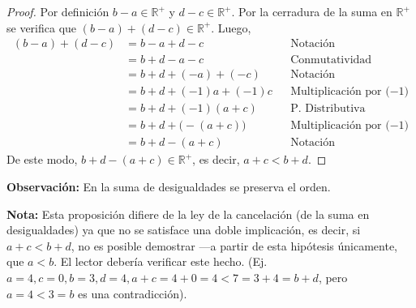 \documentclass[11pt]{article}
\newcommand{\R}{\mathbb{R}}
\begin{document}
\begin{enumerate}[label=\alph*)]
    \vspace{-1em}\begin{proof} 
        Por definición $b-a\in \R^+$ y $d-c\in \R^+$. Por la cerradura de la suma en $\R^+$ se verifica que $(b-a)+(d-c) \in \R^+$. Luego, \begin{align*}
            (b-a)+(d-c) &= b-a+d-c && \text{Notación}\\
            &= b+d-a-c && \text{Conmutatividad}\\
            &= b+d+(-a)+(-c) && \text{Notación}\\
            &= b+d+(-1)a+(-1)c && \text{Multiplicación por ($-1$)}\\
            &= b+d+ (-1) (a + c) && \text{P. Distributiva}\\
            &= b+d +\big(-(a+c) \big) && \text{Multiplicación por ($-1$)}\\
            &= b+d - (a+c) && \text{Notación}
            \end{align*}
        De este modo, $b+d-(a+c)\in \R^+$, es decir, $a+c<b+d$.    
    \end{proof} \vspace{-1em}

    \textbf{Observación:} En la suma de desigualdades se preserva el orden.

    \textbf{Nota:} Esta proposición difiere de la ley de la cancelación (de la suma en desigualdades) ya que no se satisface una doble implicación, es decir, si $a+c<b+d$, no es posible demostrar —a partir de esta hipótesis únicamente, que $a<b$. El lector debería verificar este hecho. (Ej. $a=4, c=0, b=3, d=4, a+c=4+0=4<7=3+4=b+d$, pero $a=4<3=b$ es una contradicción).

\pagebreak


\end{enumerate}
\end{document}
